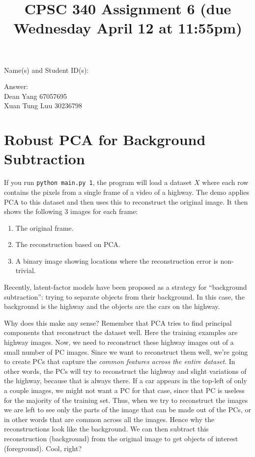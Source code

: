 \documentclass{article}
\newcommand{\blu}[1]{{\textcolor{blu}{#1}}}
\newcommand{\gre}[1]{\textcolor{gre}{#1}}
\newcommand\ans[1]{\par\gre{Answer: #1}}
\begin{document}
\title{CPSC 340 Assignment 6 (due Wednesday April 12 at 11:55pm)}
\date{}
\maketitle
\vspace{-6em}

\blu{Name(s) and Student ID(s):}
\ans{\\
Dean Yang 67057695\\
Xuan Tung Luu 30236798
}

\section{Robust PCA for Background Subtraction}

If you run \verb|python main.py 1|, the program will load a dataset $X$ where each row contains the pixels from a single frame of a video of a highway. The demo applies PCA to this dataset and then uses this to reconstruct the original image.
It then shows the following 3 images for each frame:
\begin{enumerate}
	\item The original frame.
	\item The reconstruction based on PCA.
	\item A binary image showing locations where the reconstruction error is non-trivial.
\end{enumerate}
Recently, latent-factor models have been proposed as a strategy for ``background subtraction'': trying to separate objects from their background. In this case, the background is the highway and the objects are the cars on the highway.

Why does this make any sense? Remember that PCA tries to find principal components that reconstruct the dataset well. Here the training examples are highway images. Now, we need to reconstruct these highway images out of a small number of PC images. Since we want to reconstruct them well, we're going to create PCs that capture the \emph{common features across the entire dataset}. In other words, the PCs will try to reconstruct the highway and slight variations of the highway, because that is always there. If a car appears in the top-left of only a couple images, we might not want a PC for that case, since that PC is useless for the majority of the training set. Thus, when we try to reconstruct the images we are left to see only the parts of the image that can be made out of the PCs, or in other words that are common across all the images. Hence why the reconstructions look like the background. We can then subtract this reconstruction (background) from the original image to get objects of interest (foreground). Cool, right?
\end{document}
